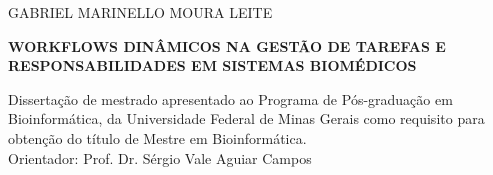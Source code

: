 \documentclass[12pt]{article}
\begin{document}
    \begin{titlepage}
        
        \center \textsc{\fontsize{14}{12}\selectfont GABRIEL MARINELLO MOURA LEITE} \\
        
        \vspace*{8cm}
        
        \newcommand{\HRule}{\rule{\linewidth}{0.5mm}}
        \textsc{\fontsize{16}{12}\selectfont \textbf{
        WORKFLOWS DINÂMICOS NA GESTÃO DE TAREFAS E\\RESPONSABILIDADES EM SISTEMAS BIOMÉDICOS}}\\[0.2cm] 
        
        \vspace*{2cm}
        
        \hspace{.3\textwidth}
        \begin{minipage}{.6\textwidth}
        \fontsize{10}{12}\selectfont Dissertação de mestrado apresentado ao Programa de Pós-graduação em Bioinformática, da Universidade Federal de Minas Gerais como requisito para obtenção do título de Mestre em Bioinformática. \\
        \linebreak
        Orientador: Prof. Dr. Sérgio Vale Aguiar Campos \\
        \end{minipage}
        
        \vspace*{\fill}
        
    \end{titlepage}
    
    
    \newpage
\end{document}

